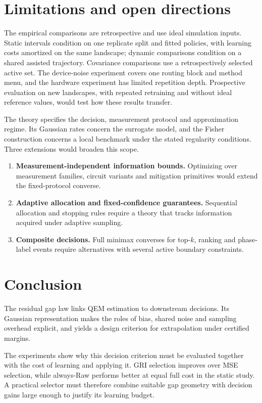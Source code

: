 \documentclass[a4paper,onecolumn,unpublished,nopdfoutputerror]{quantumarticle}
\theoremstyle{plain}
\theoremstyle{definition}
\newcommand{\1}{\mathbf{1}}
\begin{document}
\section{Limitations and open directions}

The empirical comparisons are retrospective and use ideal simulation inputs. Static intervals condition on one replicate split and fitted policies, with learning costs amortized on the same landscape; dynamic comparisons condition on a shared assisted trajectory. Covariance comparisons use a retrospectively selected active set. The device-noise experiment covers one routing block and method menu, and the hardware experiment has limited repetition depth. Prospective evaluation on new landscapes, with repeated retraining and without ideal reference values, would test how these results transfer.

The theory specifies the decision, measurement protocol and approximation regime. Its Gaussian rates concern the surrogate model, and the Fisher construction concerns a local benchmark under the stated regularity conditions. Three extensions would broaden this scope.

\begin{enumerate}[label=(\roman*)]
    \item \textbf{Measurement-independent information bounds.} Optimizing over measurement families, circuit variants and mitigation primitives would extend the fixed-protocol converse.
    \item \textbf{Adaptive allocation and fixed-confidence guarantees.} Sequential allocation and stopping rules require a theory that tracks information acquired under adaptive sampling.
    \item \textbf{Composite decisions.} Full minimax converses for top-$k$, ranking and phase-label events require alternatives with several active boundary constraints.
\end{enumerate}

\section{Conclusion}
The residual gap law links QEM estimation to downstream decisions. Its Gaussian representation makes the roles of bias, shared noise and sampling overhead explicit, and yields a design criterion for extrapolation under certified margins.

The experiments show why this decision criterion must be evaluated together with the cost of learning and applying it. GRI selection improves over MSE selection, while always-Raw performs better at equal full cost in the static study. A practical selector must therefore combine suitable gap geometry with decision gains large enough to justify its learning budget.
\end{document}
